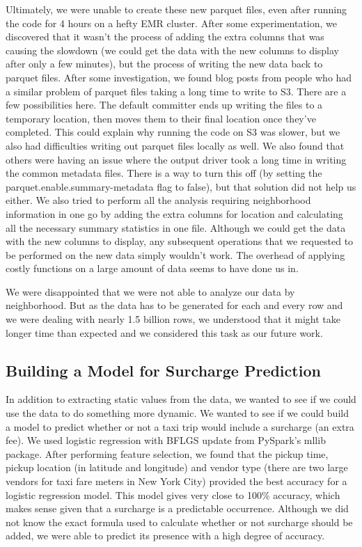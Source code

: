 \documentclass[11pt]{article} %
\begin{document}
Ultimately, we were unable to create these new parquet files, even after running the code for 4 hours on a hefty EMR cluster. After some experimentation, we discovered that it wasn’t the process of adding the extra columns that was causing the slowdown (we could get the data with the new columns to display after only a few minutes), but the process of writing the new data back to parquet files. After some investigation, we found blog posts from people who had a similar problem of parquet files taking a long time to write to S3. There are a few possibilities here. The default committer ends up writing the files to a temporary location, then moves them to their final location once they’ve completed\cite{sortable}. This could explain why running the code on S3 was slower, but we also had difficulties writing out parquet files locally as well. We also found that others were having an issue where the output driver took a long time in writing the common metadata files\cite{parquet}. There is a way to turn this off (by setting the parquet.enable.summary-metadata flag to false), but that solution did not help us either. We also tried to perform all the analysis requiring neighborhood information in one go by adding the extra columns for location and calculating all the necessary summary statistics in one file. Although we could get the data with the new columns to display, any subsequent operations that we requested to be performed on the new data simply wouldn’t work. The overhead of applying costly functions on a large amount of data seems to have done us in.

We were disappointed that we were not able to analyze our data by neighborhood. But as the data has to be generated for each and every row and we were dealing with nearly 1.5 billion rows, we understood that it might take longer time than expected and we considered this task as our future work.


\subsection{Building a Model for Surcharge Prediction}

In addition to extracting static values from the data, we wanted to see if we could use the data to do something more dynamic. We wanted to see if we could build a model to predict whether or not a taxi trip would include a surcharge (an extra fee). We used logistic regression with BFLGS update from PySpark’s mllib package. After performing feature selection, we found that the pickup time, pickup location (in latitude and longitude) and vendor type (there are two large vendors for taxi fare meters in New York City) provided the best accuracy for a logistic regression model. This model gives very close to 100\% accuracy, which makes sense given that a surcharge is a predictable occurrence. Although we did not know the exact formula used to calculate whether or not surcharge should be added, we were able to predict its presence with a high degree of accuracy.
\end{document}
